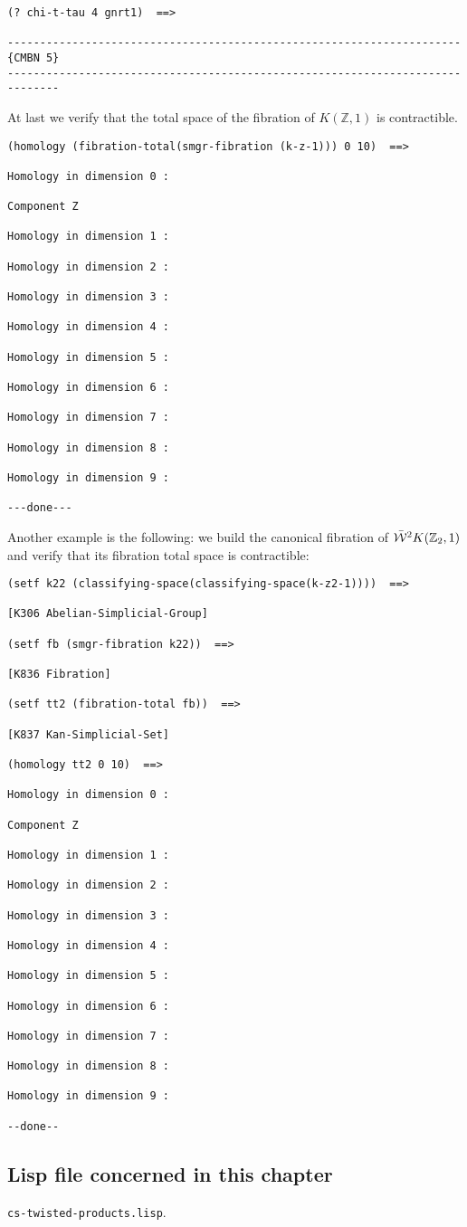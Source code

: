 \newpage
{\footnotesize\begin{verbatim}
(? chi-t-tau 4 gnrt1)  ==>

----------------------------------------------------------------------{CMBN 5}
------------------------------------------------------------------------------
\end{verbatim}}
At last we verify that the total space of the fibration of $K(\mathbb{Z},1)$ is
contractible.
{\footnotesize\begin{verbatim}
(homology (fibration-total(smgr-fibration (k-z-1))) 0 10)  ==>

Homology in dimension 0 :

Component Z

Homology in dimension 1 :

Homology in dimension 2 :

Homology in dimension 3 :

Homology in dimension 4 :

Homology in dimension 5 :

Homology in dimension 6 :

Homology in dimension 7 :

Homology in dimension 8 :

Homology in dimension 9 :

---done---
\end{verbatim}}
Another example is the following:
we build the canonical fibration of $\bar{\cal W}^2K({{\mathbb{Z}}_2}, 1)$ and verify
that its fibration total  space is contractible:
{\footnotesize\begin{verbatim}
(setf k22 (classifying-space(classifying-space(k-z2-1))))  ==>

[K306 Abelian-Simplicial-Group]

(setf fb (smgr-fibration k22))  ==>

[K836 Fibration]

(setf tt2 (fibration-total fb))  ==>

[K837 Kan-Simplicial-Set]

(homology tt2 0 10)  ==>

Homology in dimension 0 :

Component Z

Homology in dimension 1 :

Homology in dimension 2 :

Homology in dimension 3 :

Homology in dimension 4 :

Homology in dimension 5 :

Homology in dimension 6 :

Homology in dimension 7 :

Homology in dimension 8 :

Homology in dimension 9 :

--done--
\end{verbatim}}

\subsection* {Lisp file concerned in this chapter}

{\tt cs-twisted-products.lisp}.
